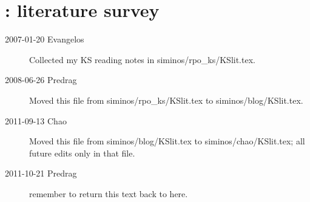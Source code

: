 
\section{\KS: literature survey}
\label{sec:KSlit}

\begin{description}

\item[2007-01-20 Evangelos]
Collected my KS reading notes in siminos/rpo\_ks/KSlit.tex.

\item[2008-06-26 Predrag]
Moved this file from siminos/rpo\_ks/KSlit.tex to
siminos/blog/KSlit.tex.

\item[2011-09-13 Chao]
Moved this file from siminos/blog/KSlit.tex to siminos/chao/KSlit.tex;
all future edits only in that file.

\item[2011-10-21 Predrag] remember to return this text back to here.

\end{description}
